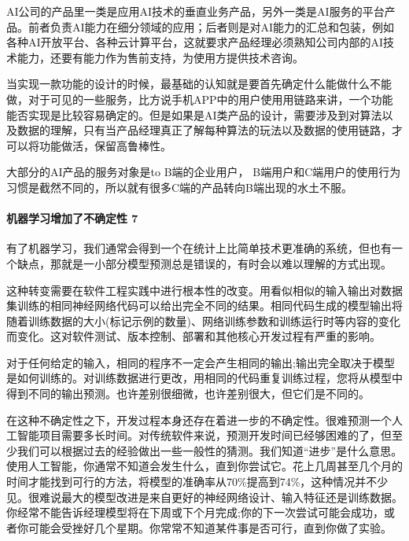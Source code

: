 \documentclass[letterpaper,11pt,english]{sphinxmanual}
\begin{document}
AI公司的产品里一类是应用AI技术的垂直业务产品，另外一类是AI服务的平台产品。前者负责AI能力在细分领域的应用；后者则是对AI能力的汇总和包装，例如各种AI开放平台、各种云计算平台，这就要求产品经理必须熟知公司内部的AI技术能力，还要有能力作为售前支持，为使用方提供技术咨询。

当实现一款功能的设计的时候，最基础的认知就是要首先确定什么能做什么不能做，对于可见的一些服务，比方说手机APP中的用户使用用链路来讲，一个功能能否实现是比较容易确定的。但是如果是AI类产品的设计，需要涉及到对算法以及数据的理解，只有当产品经理真正了解每种算法的玩法以及数据的使用链路，才可以将功能做活，保留高鲁棒性。

大部分的AI产品的服务对象是to B端的企业用户，
B端用户和C端用户的使用行为习惯是截然不同的，所以就有很多C端的产品转向B端出现的水土不服。


\paragraph{机器学习增加了不确定性 7\sphinxfootnotemark[135]}
\label{\detokenize{chapter_idea/understand_tech:id23}}%
\begin{footnotetext}[135]\sphinxAtStartFootnote
{}
%
\end{footnotetext}\ignorespaces 
有了机器学习，我们通常会得到一个在统计上比简单技术更准确的系统，但也有一个缺点，那就是一小部分模型预测总是错误的，有时会以难以理解的方式出现。

这种转变需要在软件工程实践中进行根本性的改变。用看似相似的输入输出对数据集训练的相同神经网络代码可以给出完全不同的结果。相同代码生成的模型输出将随着训练数据的大小(标记示例的数量)、网络训练参数和训练运行时等内容的变化而变化。这对软件测试、版本控制、部署和其他核心开发过程有严重的影响。

对于任何给定的输入，相同的程序不一定会产生相同的输出;输出完全取决于模型是如何训练的。对训练数据进行更改，用相同的代码重复训练过程，您将从模型中得到不同的输出预测。也许差别很细微，也许差别很大，但它们是不同的。

在这种不确定性之下，开发过程本身还存在着进一步的不确定性。很难预测一个人工智能项目需要多长时间。对传统软件来说，预测开发时间已经够困难的了，但至少我们可以根据过去的经验做出一些一般性的猜测。我们知道“进步”是什么意思。使用人工智能，你通常不知道会发生什么，直到你尝试它。花上几周甚至几个月的时间才能找到可行的方法，将模型的准确率从70\%提高到74\%，这种情况并不少见。很难说最大的模型改进是来自更好的神经网络设计、输入特征还是训练数据。你经常不能告诉经理模型将在下周或下个月完成;你的下一次尝试可能会成功，或者你可能会受挫好几个星期。你常常不知道某件事是否可行，直到你做了实验。
\end{document}
